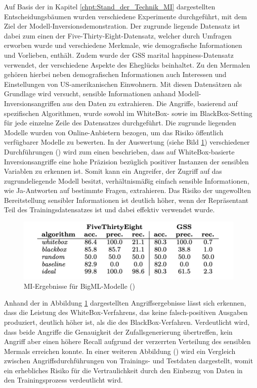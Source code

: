 Auf Basis der in Kapitel \ref{chpt:Stand_der_Technik_MI} dargestellten Entscheidungsbäumen wurden verschiedene Experimente durchgeführt, mit dem Ziel der Modell-Inversionsdemonstration. Der zugrunde liegende Datensatz ist dabei zum einen der \glqq Five-Thirty-Eight\grqq{}-Datensatz, welcher durch Umfragen erworben wurde und verschiedene Merkmale, wie demografische Informationen und Vorlieben, enthält. Zudem wurde der \glqq GSS marital happiness\grqq{}-Datensatz verwendet, der verschiedene Aspekte des Eheglücks beinhaltet. Zu den Mermalen gehören hierbei neben demografischen Informationen auch Interessen und Einstellungen von US-amerikanischen Einwohnern. Mit diesen Datensätzen als Grundlage wird versucht, sensible Informationen anhand Modell-Inversionsangriffen aus den Daten zu extrahieren. Die Angriffe, basierend auf spezifischen Algorithmen, wurde sowohl im WhiteBox- sowie im BlackBox-Setting für jede einzelne Zeile des Datensatzes durchgeführt. Die zugrunde liegenden Modelle wurden von \glqq Online-Anbietern\grqq{} bezogen, um das Risiko öffentlich verfügbarer Modelle zu bewerten. In der Auswertung (siehe Bild \ref{img:frederikson_2015_evaluation}) verschiedener Durchführungen (\cite[S. 5 ff.]{fredrikson_model_2015}) wird zum einen beschrieben, dass auf WhiteBox-basierte Inversionsangriffe eine hohe Präzision bezüglich positiver Instanzen der sensiblen Variablen zu erkennen ist. Somit kann ein Angreifer, der Zugriff auf das zugrundeliegende Modell besitzt, verhältnismäßig einfach sensible Informationen, wie \glqq Ja\grqq{}-Antworten auf bestimmte Fragen, extrahieren. Das Risiko der \glqq ungewollten Bereitstellung\grqq{} sensibler Informationen ist deutlich höher, wenn der Repräsentant Teil des Trainingsdatensatzes ist und dabei effektiv verwendet wurde. 
\begin{figure}[H]
	\centering
	\includegraphics[width=0.6\linewidth]{Bilder/frederikson_2015_1.png}
	\caption{MI-Ergebnisse für BigML-Modelle (\cite[S. 6, Figure 4]{fredrikson_model_2015})}
	\label{img:frederikson_2015_evaluation}
\end{figure}
Anhand der in Abbildung \ref{img:frederikson_2015_evaluation} dargestellten Angriffsergebnisse lässt sich erkennen, dass die Leistung des WhiteBox-Verfahrens, das keine falsch-positiven Ausgaben produziert, deutlich höher ist, als die des BlackBox-Verfahren. Verdeutlicht wird, dass beide Angriffe die Genauigkeit der Zufallsgenerierung übertreffen, kein Angriff aber einen höhere Recall aufgrund der verzerrten Verteilung des sensiblen Mermals erreichen konnte. In einer weiteren Abbildung (\cite[S. 7, Figure 5]{fredrikson_model_2015}) wird ein Vergleich zwischen Angriffsdurchführungen von Trainings- und Testdaten dargestellt, womit ein erhebliches Risiko für die Vertraulichkeit durch den Einbezug von Daten in den Trainingsprozess verdeutlicht wird. 

